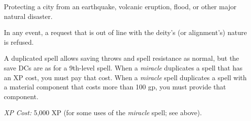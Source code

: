 Protecting a city from an earthquake, volcanic eruption, flood, or other major 
natural disaster.

In any event, a request that is out of line with the deity's (or alignment's) nature 
is refused.

A duplicated spell allows saving throws and spell resistance as normal, but the 
save DCs are as for a 9th-level spell. When a \textit{miracle} duplicates a spell 
that has an XP cost, you must pay that cost. When a \textit{miracle} spell duplicates 
a spell with a material component that costs more than 100 gp, you must provide 
that component.

\textit{XP Cost:} 5,000 XP (for some uses of the \textit{miracle} spell; see above).

